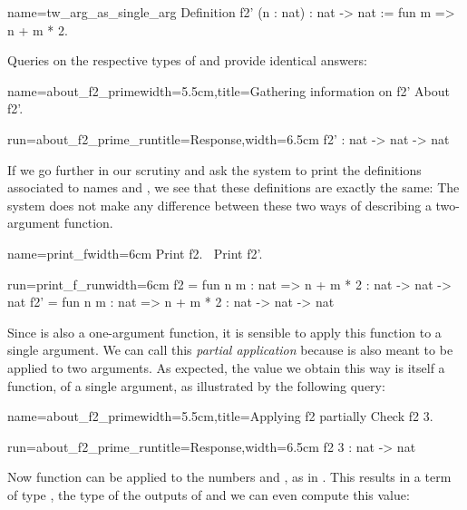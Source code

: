 \begin{coq}{name=tw_arg_as_single_arg}{}
Definition f2' (n : nat) : nat -> nat := fun m => n + m * 2.
\end{coq}

Queries on the respective types of  and  provide identical answers:
\begin{coq}{name=about_f2_prime}{width=5.5cm,title=Gathering information on f2'}
About f2'.
\end{coq}
\begin{coqout}{run=about_f2_prime_run}{title=Response,width=6.5cm}
f2' : nat -> nat -> nat
\end{coqout}

If we go further in our scrutiny and ask the \Coq{} system to print
the definitions associated to names  and , we see that these
definitions are exactly the same: The \Coq{} system does not make any
difference between these two ways of describing a two-argument function.

\begin{coq}{name=print_f}{width=6cm}
Print f2.
$~$
Print f2'.
$~$
\end{coq}
\begin{coqout}{run=print_f_run}{width=6cm}
f2 = fun n m : nat => n + m * 2
  : nat -> nat -> nat
f2' = fun n m : nat => n + m * 2
  : nat -> nat -> nat
\end{coqout}

Since  is also a one-argument function, it is sensible to apply this
function to a single argument.  We can call this {\em partial application}
because  is also meant to be applied to two arguments.
As expected, the value we obtain this way is itself a function, of a
single argument, as illustrated by the following query:

\begin{coq}{name=about_f2_prime}{width=5.5cm,title=Applying f2 partially}
Check f2 3.
\end{coq}
\begin{coqout}{run=about_f2_prime_run}{title=Response,width=6.5cm}
f2 3 : nat -> nat
\end{coqout}

Now function  can be applied to the numbers  and , as
in . This results in a term of type , the type of the
outputs of  and we can even compute this value:

